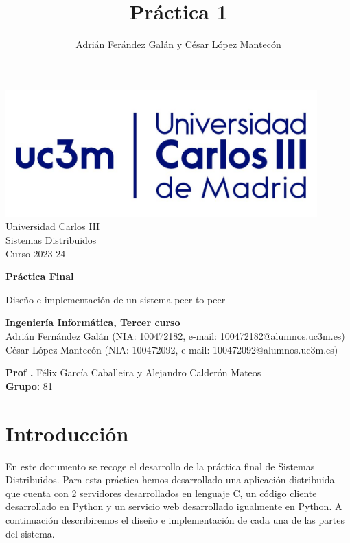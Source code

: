 \documentclass[]{article}
\title{Práctica 1}
\author{Adrián Ferández Galán y César López Mantecón}
\begin{document}
\begin{titlepage}
    \centering
   \includegraphics[width=0.9\textwidth]{uc3m.jpg} 
    {\Huge Universidad Carlos III\\
    
     \Large Sistemas Distribuidos\\
     \vspace{0.5cm}
     Curso 2023-24}
    \vspace{2cm}

    {\Huge \textbf{Práctica Final} \par}
    \vspace{0.5cm}
    {\Large Diseño e implementación de un sistema peer-to-peer \par}
    \vspace{8cm}

   \textbf{Ingeniería Informática, Tercer curso}\\
    \vspace{0.2cm} 
    Adrián Fernández Galán (NIA: 100472182, e-mail: 100472182@alumnos.uc3m.es) \\
    César López Mantecón   (NIA: 100472092, e-mail: 100472092@alumnos.uc3m.es)
    \vspace{0.5cm}

   
    \textbf{Prof .} Félix García Caballeira y Alejandro Calderón Mateos\\
    
    \textbf{Grupo: } 81   
    
\end{titlepage}
\newpage

\renewcommand{\contentsname}{\centering Índice}
\tableofcontents

\newpage

\section{Introducción}
\label{sec:introduccion}
En este documento se recoge el desarrollo de la práctica final de Sistemas Distribuidos. Para esta práctica hemos desarrollado una aplicación distribuida que cuenta con 2 servidores desarrollados en lenguaje C, un código cliente desarrollado en Python y un servicio web desarrollado igualmente en Python. A continuación describiremos el diseño e implementación de cada una de las partes del sistema. 
\end{document}
